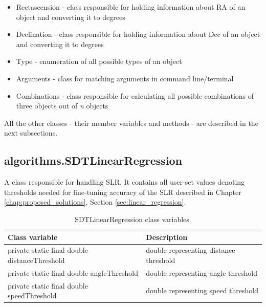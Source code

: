 \begin{itemize}
	\item Rectascension - class responsible for holding information about RA of an object and converting it to degrees
	\item Declination - class responsible for holding information about Dec of an object and converting it to degrees
	\item Type - enumeration of all possible types of an object
	\item Arguments - class for matching arguments in command line/terminal
	\item Combinations - class responsible for calculating all possible combinations of three objects out of \emph{n} objects
\end{itemize}

	All the other classes - their member variables and methods - are described in the next subsections.
	
\newpage
	
\subsection{algorithms.SDTLinearRegression}\label{subsec:slr}

	A class responsible for handling SLR. It contains all user-set values denoting thresholds needed for fine-tuning accuracy of the SLR described in Chapter \ref{chap:proposed_solutions}, Section \ref{sec:linear_regression}.
	
\begin{table}[H]
\centering
\setlength{\extrarowheight}{2pt}
\begin{tabularx}{\textwidth}{|X|X|}
\hline
\textbf{Class variable} & \textbf{Description} \\ \hline
private static final double \mbox{distanceThreshold} & double representing distance threshold \\ \hline
private static final double \mbox{angleThreshold} & double representing angle threshold    \\ \hline
private static final double \mbox{speedThreshold} & double representing speed threshold    \\ \hline
\end{tabularx}
\caption{SDTLinearRegression class variables.}
\label{tab:class_variables_LR}
\end{table}

